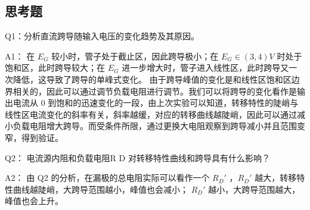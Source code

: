 \documentclass[lang=cn,11pt,a4paper,cite=authoryear]{elegantpaper}
\begin{document}
\subsection{思考题}

Q1：分析直流跨导随输入电压的变化趋势及其原因。

A1：
在 \(E_G\) 较小时，管子处于截止区，因此跨导极小；在 \(E_G \in (3, 4) V \)  时处于饱和区，此时跨导较大；在 \(E_G\) 进一步增大时，管子进入线性区，此时跨导又一次降低，这导致了跨导的单峰式变化。
由于跨导峰值的变化是和线性区饱和区边界相关的，因此可以通过调节负载电阻进行调节。我们可以将跨导的变化看作是输出电流从 \(0\) 到饱和的迅速变化的一段，由上次实验可以知道，转移特性的陡峭与线性区电流变化的斜率有关，斜率越缓，对应的转移曲线越陡峭，因此可以通过减小负载电阻增大跨导。而受条件所限，通过更换大电阻观察到跨导减小并且范围变窄，得到验证。

Q2： 电流源内阻和负载电阻R D 对转移特性曲线和跨导具有什么影响？

A2： 由 Q2 的分析，在漏极的总电阻实际可以看作一个 \(R_D'\) ，\(R_D'\) 越大，转移特性曲线越陡峭，大跨导范围越小，峰值也会减小； \(R_D'\) 越小，大跨导范围越大，峰值也会上升。

\end{document}
